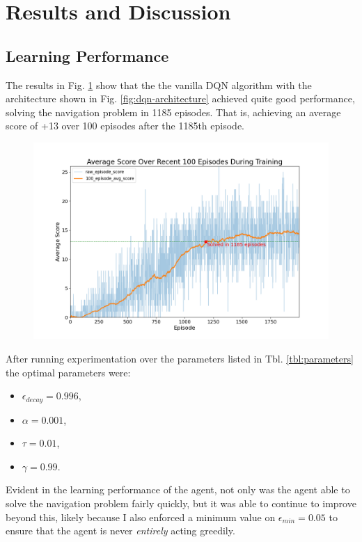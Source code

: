 \documentclass[11pt]{article}
\begin{document}
\section{Results and Discussion}

\subsection{Learning Performance}

The results in Fig. \ref{fig:dqn-results} show that the the vanilla DQN
algorithm with the architecture shown in Fig. \ref{fig:dqn-architecture} achieved 
quite good performance, solving the navigation problem in 1185 episodes. That is, 
achieving an average score of +13 over 100 episodes after the 1185th episode.

\FloatBarrier

\begin{figure}[!ht]
	\centering
	\includegraphics[width=0.9\linewidth]{images/dqn-results.png}
	\caption{}
	\label{fig:dqn-results}
\end{figure}

\FloatBarrier

After running experimentation over the parameters listed in Tbl. \ref{tbl:parameters} 
the optimal parameters were:
\begin{itemize}
	\item $\epsilon_{decay} = 0.996$,
	\item $\alpha = 0.001$,
	\item $\tau = 0.01$,
	\item $\gamma = 0.99$.
\end{itemize}

Evident in the learning performance of the agent, not only was the agent able to 
solve the navigation problem fairly quickly, but it was able to continue to improve 
beyond this, likely because I also enforced a minimum value on $\epsilon_{min} = 0.05$ 
to ensure that the agent is never \textit{entirely} acting greedily.
\end{document}
